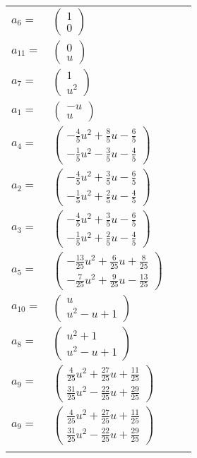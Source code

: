 \documentclass[1p]{elsarticle_modified}
\theoremstyle{definition}
\begin{document}
\begin{tabular}{m{7pt} m{180pt} m{7pt} m{180pt} }
\flushright $a_{6}=$&$\begin{pmatrix}1\\0\end{pmatrix}$ \\
\flushright $a_{11}=$&$\begin{pmatrix}0\\u\end{pmatrix}$ \\
\flushright $a_{7}=$&$\begin{pmatrix}1\\u^2\end{pmatrix}$ \\
\flushright $a_{1}=$&$\begin{pmatrix}- u\\u\end{pmatrix}$ \\
\flushright $a_{4}=$&$\begin{pmatrix}-\frac{4}{5} u^2+\frac{8}{5} u-\frac{6}{5}\\-\frac{1}{5} u^2-\frac{3}{5} u-\frac{4}{5}\end{pmatrix}$ \\
\flushright $a_{2}=$&$\begin{pmatrix}-\frac{4}{5} u^2+\frac{3}{5} u-\frac{6}{5}\\-\frac{1}{5} u^2+\frac{2}{5} u-\frac{4}{5}\end{pmatrix}$ \\
\flushright $a_{3}=$&$\begin{pmatrix}-\frac{4}{5} u^2+\frac{3}{5} u-\frac{6}{5}\\-\frac{1}{5} u^2+\frac{2}{5} u-\frac{4}{5}\end{pmatrix}$ \\
\flushright $a_{5}=$&$\begin{pmatrix}-\frac{13}{25} u^2+\frac{6}{25} u+\frac{8}{25}\\-\frac{7}{25} u^2+\frac{9}{25} u-\frac{13}{25}\end{pmatrix}$ \\
\flushright $a_{10}=$&$\begin{pmatrix}u\\u^2- u+1\end{pmatrix}$ \\
\flushright $a_{8}=$&$\begin{pmatrix}u^2+1\\u^2- u+1\end{pmatrix}$ \\
\flushright $a_{9}=$&$\begin{pmatrix}\frac{4}{25} u^2+\frac{27}{25} u+\frac{11}{25}\\\frac{31}{25} u^2-\frac{22}{25} u+\frac{29}{25}\end{pmatrix}$\\ \flushright $a_{9}=$&$\begin{pmatrix}\frac{4}{25} u^2+\frac{27}{25} u+\frac{11}{25}\\\frac{31}{25} u^2-\frac{22}{25} u+\frac{29}{25}\end{pmatrix}$\\&\end{tabular}
\end{document}
